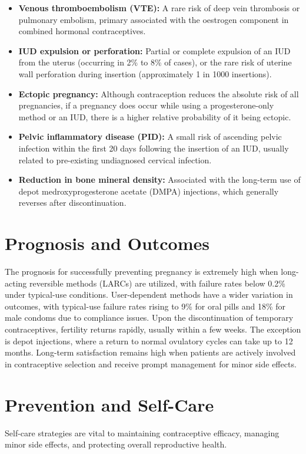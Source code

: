 \begin{itemize}
    \item \textbf{Venous thromboembolism (VTE):} A rare risk of deep vein thrombosis or pulmonary embolism, primary associated with the oestrogen component in combined hormonal contraceptives.
    \item \textbf{IUD expulsion or perforation:} Partial or complete expulsion of an IUD from the uterus (occurring in 2\% to 8\% of cases), or the rare risk of uterine wall perforation during insertion (approximately 1 in 1000 insertions).
    \item \textbf{Ectopic pregnancy:} Although contraception reduces the absolute risk of all pregnancies, if a pregnancy does occur while using a progesterone-only method or an IUD, there is a higher relative probability of it being ectopic.
    \item \textbf{Pelvic inflammatory disease (PID):} A small risk of ascending pelvic infection within the first 20 days following the insertion of an IUD, usually related to pre-existing undiagnosed cervical infection.
    \item \textbf{Reduction in bone mineral density:} Associated with the long-term use of depot medroxyprogesterone acetate (DMPA) injections, which generally reverses after discontinuation.
\end{itemize}

\section*{Prognosis and Outcomes}
The prognosis for successfully preventing pregnancy is extremely high when long-acting reversible methods (LARCs) are utilized, with failure rates below 0.2\% under typical-use conditions. User-dependent methods have a wider variation in outcomes, with typical-use failure rates rising to 9\% for oral pills and 18\% for male condoms due to compliance issues. Upon the discontinuation of temporary contraceptives, fertility returns rapidly, usually within a few weeks. The exception is depot injections, where a return to normal ovulatory cycles can take up to 12 months. Long-term satisfaction remains high when patients are actively involved in contraceptive selection and receive prompt management for minor side effects.

\section*{Prevention and Self-Care}
Self-care strategies are vital to maintaining contraceptive efficacy, managing minor side effects, and protecting overall reproductive health.

